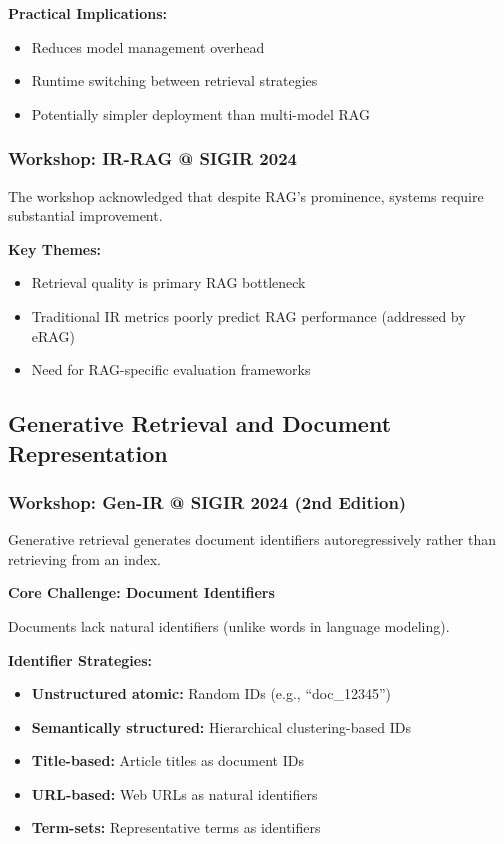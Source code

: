 \documentclass[11pt,letterpaper]{article}
\begin{document}
\textbf{Practical Implications:}
\begin{itemize}[leftmargin=*]
    \item Reduces model management overhead
    \item Runtime switching between retrieval strategies
    \item Potentially simpler deployment than multi-model RAG
\end{itemize}

\subsubsection{Workshop: IR-RAG @ SIGIR 2024}

The workshop acknowledged that despite RAG's prominence, systems require substantial improvement.

\textbf{Key Themes:}
\begin{itemize}[leftmargin=*]
    \item Retrieval quality is primary RAG bottleneck
    \item Traditional IR metrics poorly predict RAG performance (addressed by eRAG)
    \item Need for RAG-specific evaluation frameworks
\end{itemize}

\subsection{Generative Retrieval and Document Representation}

\subsubsection{Workshop: Gen-IR @ SIGIR 2024 (2nd Edition)}

Generative retrieval generates document identifiers autoregressively rather than retrieving from an index.

\textbf{Core Challenge: Document Identifiers}

Documents lack natural identifiers (unlike words in language modeling).

\textbf{Identifier Strategies:}
\begin{itemize}[leftmargin=*]
    \item \textbf{Unstructured atomic:} Random IDs (e.g., ``doc\_12345'')
    \item \textbf{Semantically structured:} Hierarchical clustering-based IDs
    \item \textbf{Title-based:} Article titles as document IDs
    \item \textbf{URL-based:} Web URLs as natural identifiers
    \item \textbf{Term-sets:} Representative terms as identifiers
\end{itemize}
\end{document}
